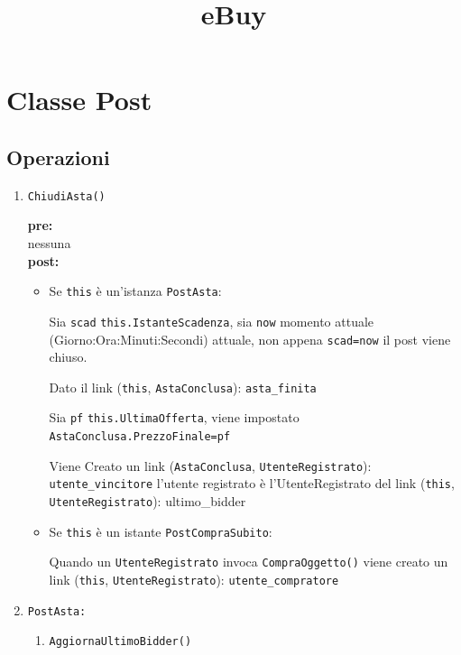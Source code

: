 \documentclass{article}
\begin{document}
\title{eBuy}
\maketitle
\section{Classe Post}
\subsection{Operazioni}

\begin{enumerate}
    \item \texttt{ChiudiAsta()}
    
    \textbf{pre:} \\ 
            nessuna    \\
    \textbf{post:} 
    
    \begin{itemize}
        \item Se \texttt{this} è un'istanza \texttt{PostAsta}:
        
        Sia \texttt{scad} \texttt{this.IstanteScadenza}, sia \texttt{now} momento attuale (Giorno:Ora:Minuti:Secondi) attuale, non appena \texttt{scad=now} il post viene chiuso.
        
        Dato il link (\texttt{this}, \texttt{AstaConclusa}): \texttt{asta\_finita}
        
        Sia \texttt{pf} \texttt{this.UltimaOfferta}, viene impostato \texttt{AstaConclusa.PrezzoFinale=pf}
        
        Viene Creato un link (\texttt{AstaConclusa}, \texttt{UtenteRegistrato}): \texttt{utente\_vincitore} l'utente registrato è l'UtenteRegistrato del link (\texttt{this}, \texttt{UtenteRegistrato}): {ultimo\_bidder}
        
        \item Se \texttt{this} è un istante \texttt{PostCompraSubito}:
        
        Quando un \texttt{UtenteRegistrato} invoca \texttt{CompraOggetto()} viene creato un link (\texttt{this}, \texttt{UtenteRegistrato}): \texttt{utente\_compratore}
    \end{itemize}
    
    \item \texttt{PostAsta:}
    
    \begin{enumerate}
        \item \texttt{AggiornaUltimoBidder()}
        

\end{enumerate}
\end{enumerate}
\end{document}

